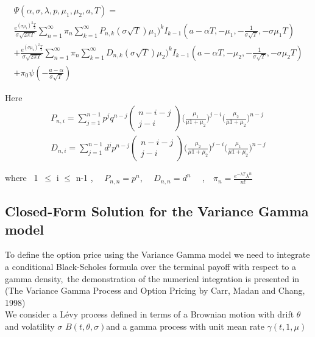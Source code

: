 \documentclass[12pt]{report}
\begin{document}
\begin{align}
\Psi(\alpha,\sigma,\lambda,p,\mu_1,\mu_2,a,T) = \nonumber \\
\frac{e^{(\sigma \mu_1)^2\frac{T}{2}}}{\sigma \sqrt{2 \pi T}} \sum\limits_{n=1}^\infty  \pi_n\sum\limits_{k=1}^\infty  P_{n,k}(\sigma \sqrt{T})\mu_1)^k I_{k-1}(a-\alpha T,-\mu_1 ,-\frac{1}{\sigma \sqrt{T}},-\sigma \mu_1 T ) \nonumber \\
+\frac{e^{(\sigma \mu_2)^2\frac{T}{2}}}{\sigma \sqrt{2 \pi T}} \sum\limits_{n=1}^\infty  \pi_n\sum\limits_{k=1}^\infty  D_{n,k}(\sigma \sqrt{T})\mu_2)^k I_{k-1}(a-\alpha T,-\mu_2 ,-\frac{1}{\sigma \sqrt{T}},-\sigma \mu_2 T ) \nonumber \\
+ \pi_0 \psi(-\frac{a- \alpha}{\sigma \sqrt{T}})    
\end{align}

Here 
\begin{gather*}
P_{n,i}=\sum_{j=1}^{n-1} p^j q^{n-j} \left( \begin{matrix} n-i-j\\ j-i \end{matrix} \right) \big (\frac{\mu_1}{\mu1+\mu_2}\big )^{j-i}\big (\frac{\mu_2}{\mu1+\mu_2}\big )^{n-j} \\
D_{n,i}=\sum_{j=1}^{n-1} d^j p^{n-j} \left( \begin{matrix} n-i-j\\ j-i \end{matrix} \right) \big (\frac{\mu_2}{\mu1+\mu_2}\big )^{j-i}\big (\frac{\mu_1}{\mu1+\mu_2}\big )^{n-j}
\end{gather*}

where 
~1~$\leqslant$ i $\leqslant$ n-1 , ~~$P_{n,n}=p^n$, ~~$ D_{n,n}=d^n$~~ ,~~$\pi_n=\frac{e^{-\lambda T}  \lambda ^n}{n!}$
\subsection{Closed-Form Solution for the Variance Gamma model }
To define the option price using the Variance Gamma model we need to integrate a conditional Black-Scholes formula over the terminal payoff with respect to a gamma density,~the demonstration of the numerical integration is presented in (The Variance Gamma Process and Option Pricing by Carr, Madan and Chang, 1998)\\

We consider a Lévy process defined in terms of a Brownian motion with drift $\theta$ and volatility $\sigma$ $B(t,\theta,\sigma)$and a gamma process with unit mean rate $\gamma(t,1,\mu)$
\end{document}
